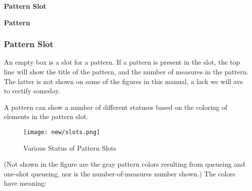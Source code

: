    \begin{enumber}
      \item \textbf{Pattern Slot}
      \item \textbf{Pattern}
   \end{enumber}

\subsubsection{Pattern Slot}
\label{subsubsec:seq64_patterns_pattern_slot}

   An empty box is a slot for a pattern.
   If a pattern is present in the slot, the top line will show
   the title of the pattern, and the number of measures in the pattern.
   The latter is not shown on some of the figures in this manual, a
   lack we will ave to rectify someday.

   A pattern can show a number of different statuses based on the coloring
   of elements in the pattern slot. 

\begin{figure}[H]
   \centering 
   \texttt{[image: new/slots.png]}
   \caption{Various Status of Pattern Slots}
   \label{fig:pattern_slots_statuses}
\end{figure}

   (Not shown in the figure are the gray pattern
   colors resulting from queueing and one-shot queueing, nor is the
   number-of-measures number shown.)
   The colors have meaning:

